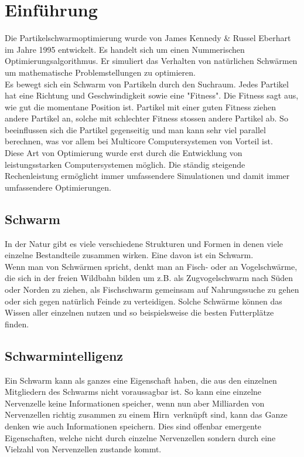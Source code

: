 \section{Einführung}
		Die Partikelschwarmoptimierung wurde von James Kennedy \& Russel Eberhart im Jahre 1995 entwickelt. Es handelt sich um einen Nummerischen Optimierungsalgorithmus. Er simuliert das Verhalten von natürlichen Schwärmen um mathematische Problemstellungen zu optimieren.\\
		Es bewegt sich ein Schwarm von Partikeln durch den Suchraum. Jedes Partikel hat eine Richtung und Geschwindigkeit sowie eine "Fitness". Die Fitness sagt aus, wie gut die momentane Position ist. Partikel mit einer guten Fitness ziehen andere Partikel an, solche mit schlechter Fitness stossen andere Partikel ab. So beeinflussen sich die Partikel gegenseitig und man kann sehr viel parallel berechnen, was vor allem bei Multicore Computersystemen von Vorteil ist. \\
		Diese Art von Optimierung wurde erst durch die Entwicklung von leistungsstarken Computersystemen möglich. Die ständig steigende Rechenleistung ermöglicht immer umfassendere Simulationen und damit immer umfassendere Optimierungen.
		\subsection{Schwarm}
		In der Natur gibt es viele verschiedene Strukturen und Formen in denen viele einzelne Bestandteile zusammen wirken. Eine davon ist ein Schwarm.\\
		Wenn man von Schwärmen spricht, denkt man an Fisch- oder an Vogelschwärme, die sich in der freien Wildbahn  bilden um z.B. als Zugvogelschwarm nach Süden oder Norden zu ziehen, als Fischschwarm gemeinsam auf Nahrungssuche zu gehen oder sich gegen natürlich Feinde zu verteidigen. Solche Schwärme können das Wissen aller einzelnen nutzen und so beispielsweise die besten Futterplätze finden.
		\subsection{Schwarmintelligenz}
		Ein Schwarm kann als ganzes eine Eigenschaft haben, die aus den einzelnen Mitgliedern des Schwarms nicht voraussagbar ist. So kann eine einzelne Nervenzelle keine Informationen speicher, wenn nun aber Milliarden von Nervenzellen richtig zusammen zu einem \textacutedbl Hirn\textacutedbl \ verknüpft sind, kann das Ganze denken wie auch Informationen speichern. Dies sind offenbar emergente Eigenschaften, welche nicht durch einzelne Nervenzellen sondern durch eine Vielzahl von Nervenzellen zustande kommt.
		\cite{partice-swarm-optimization}
